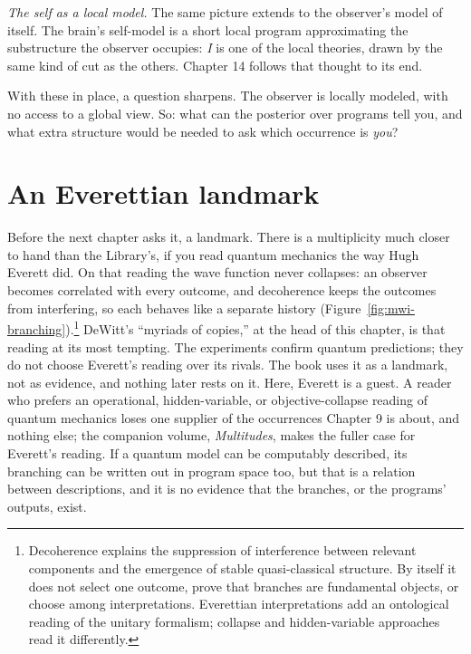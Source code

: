 \emph{The self as a local model.} The same picture extends to the observer's model of itself. The brain's self-model is a short local program approximating the substructure the observer occupies: \emph{I} is one of the local theories, drawn by the same kind of cut as the others. Chapter 14 follows that thought to its end.

With these in place, a question sharpens. The observer is locally modeled, with no access to a global view. So: what can the posterior over programs tell you, and what extra structure would be needed to ask which occurrence is \emph{you}?

\section*{An Everettian landmark}

Before the next chapter asks it, a landmark. There is a multiplicity much closer to hand than the Library's, if you read quantum mechanics the way Hugh Everett did. On that reading the wave function never collapses: an observer becomes correlated with every outcome, and decoherence keeps the outcomes from interfering, so each behaves like a separate history (Figure~\ref{fig:mwi-branching}).\footnote{Decoherence explains the suppression of interference between relevant components and the emergence of stable quasi-classical structure. By itself it does not select one outcome, prove that branches are fundamental objects, or choose among interpretations. Everettian interpretations add an ontological reading of the unitary formalism; collapse and hidden-variable approaches read it differently.} DeWitt's ``myriads of copies,'' at the head of this chapter, is that reading at its most tempting. The experiments confirm quantum predictions; they do not choose Everett's reading over its rivals. The book uses it as a landmark, not as evidence, and nothing later rests on it. Here, Everett is a guest. A reader who prefers an operational, hidden-variable, or objective-collapse reading of quantum mechanics loses one supplier of the occurrences Chapter 9 is about, and nothing else; the companion volume, \textit{Multitudes}, makes the fuller case for Everett's reading. If a quantum model can be computably described, its branching can be written out in program space too, but that is a relation between descriptions, and it is no evidence that the branches, or the programs' outputs, exist.


